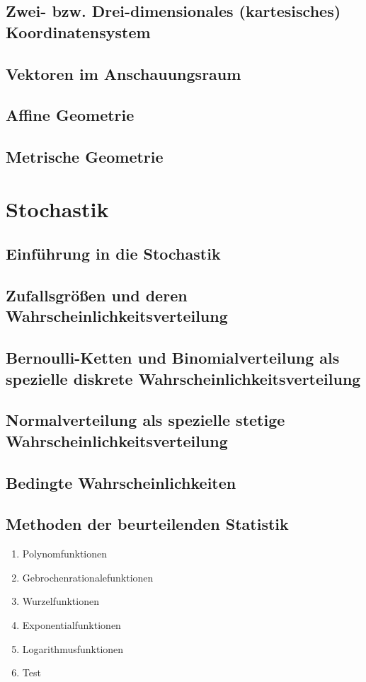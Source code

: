 \documentclass{article}
\begin{document}
	\subsection{Zwei- bzw. Drei-dimensionales (kartesisches) Koordinatensystem}
	\subsection{Vektoren im Anschauungsraum}
	\subsection{Affine Geometrie}
	\subsection{Metrische Geometrie}

\section{Stochastik}
	\subsection{Einführung in die Stochastik}
	\subsection{Zufallsgrößen und deren Wahrscheinlichkeitsverteilung}
	\subsection{Bernoulli-Ketten und Binomialverteilung als spezielle diskrete Wahrscheinlichkeitsverteilung}
	\subsection{Normalverteilung als spezielle stetige Wahrscheinlichkeitsverteilung}
	\subsection{Bedingte Wahrscheinlichkeiten}
	\subsection{Methoden der beurteilenden Statistik}


\begin{enumerate}
    \item Polynomfunktionen
    \item Gebrochenrationalefunktionen
    \item Wurzelfunktionen
    \item Exponentialfunktionen
    \item Logarithmusfunktionen
    \item Test
\end{enumerate}
\end{document}

